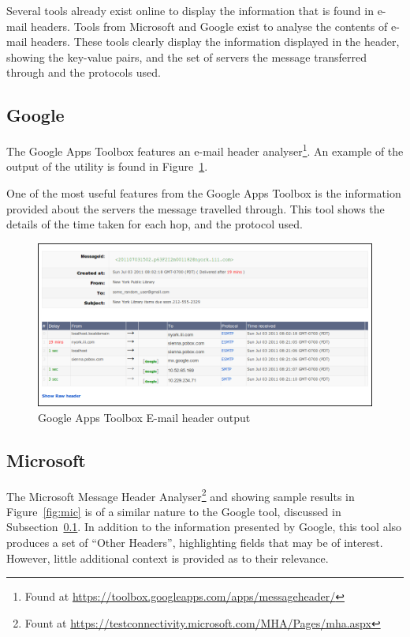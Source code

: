 Several tools already exist online to display the information that is found in
e-mail headers.  Tools from Microsoft and Google exist to analyse the contents
of e-mail headers.  These tools clearly display the information displayed in
the header, showing the key-value pairs, and the set of servers the message
transferred through and the protocols used.

\subsection{Google}\label{sec:goo}

The Google Apps Toolbox features an e-mail header analyser\footnote{Found at
	\url{https://toolbox.googleapps.com/apps/messageheader/}}. An example
of the output of the utility is found in Figure~\ref{fig:goo}.

One of the most useful features from the Google Apps Toolbox is the information
provided about the servers the message travelled through.  This tool shows the
details of the time taken for each hop, and the protocol used.

\begin{figure}[ht] \centering
\includegraphics[width=0.9\linewidth]{google-header}
\caption{Google Apps Toolbox E-mail header output} \label{fig:goo}\end{figure}

\subsection{Microsoft}\label{sec:mic}

The Microsoft Message Header Analyser\footnote{Fount at
	\url{https://testconnectivity.microsoft.com/MHA/Pages/mha.aspx}} and
showing sample results in Figure~\ref{fig:mic} is of a similar nature to the
Google tool, discussed in Subsection~\ref{sec:goo}.  In addition to the
information presented by Google, this tool also produces a set of ``Other
Headers'', highlighting fields that may be of interest.  However, little
additional context is provided as to their relevance.

